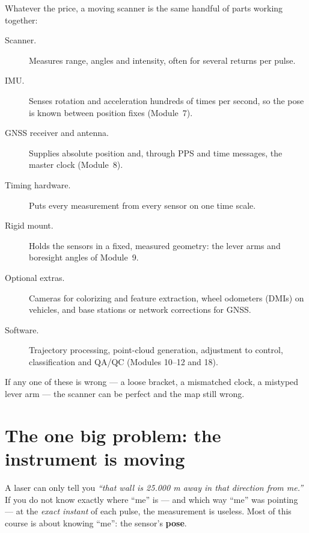 Whatever the price, a moving scanner is the same handful of parts working together:
\begin{description}
\item[Scanner.] Measures range, angles and intensity, often for several returns per pulse.
\item[IMU.] Senses rotation and acceleration hundreds of times per second, so the pose is known between position fixes (Module~7).
\item[GNSS receiver and antenna.] Supplies absolute position and, through PPS and time messages, the master clock (Module~8).
\item[Timing hardware.] Puts every measurement from every sensor on one time scale.
\item[Rigid mount.] Holds the sensors in a fixed, measured geometry: the lever arms and boresight angles of Module~9.
\item[Optional extras.] Cameras for colorizing and feature extraction, wheel odometers (DMIs) on vehicles, and base stations or network corrections for GNSS.
\item[Software.] Trajectory processing, point-cloud generation, adjustment to control, classification and QA/QC (Modules 10--12 and 18).
\end{description}
If any one of these is wrong --- a loose bracket, a mismatched clock, a mistyped lever arm --- the scanner can be perfect and the map still wrong.

\section{The one big problem: the instrument is moving}

\begin{bigidea}
A laser can only tell you \emph{``that wall is 25.000 m away in that direction from me.''} If you do not know exactly where ``me'' is --- and which way ``me'' was pointing --- at the \emph{exact instant} of each pulse, the measurement is useless. Most of this course is about knowing ``me'': the sensor's \textbf{pose}.
\end{bigidea}


